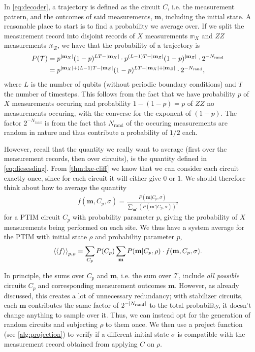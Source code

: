 In \cref{eq:decoder}, a trajectory is defined as the circuit $C$, i.e. the measurement pattern,
and the outcomes of said measurements, $\mathbf{m}$, including the initial
state. A reasonable place to start is to find a probability we average over.
If we split the measurement record into disjoint records of $X$
measurements $\mathbb{m}_X$ and $ZZ$ measurements $\mathbb{m}_Z$, we have that
the probability of a trajectory is
\begin{align}
      P(\mathcal{T}) &=
      p^{\abs{\mathbf{m}_X}}(1-p)^{LT-\abs{\mathbf{m}_X}}\cdot
      p^{(L-1)T-\abs{\mathbf{m}_Z}}(1-p)^{\abs{\mathbf{m}_Z}}\cdot
      2^{-N_\mathrm{rand}} \nonumber\\ &= 
      p^{\abs{\mathbf{m}_X}+(L-1)T-\abs{\mathbf{m}_Z}}(1-p)^{LT-\abs{\mathbf{m}_X}+\abs{\mathbf{m}_Z}}\cdot2^{-N_\mathrm{rand}}
,\end{align}
where $L$ is the number of qubits (without periodic boundary conditions) and
$T$ the number of timesteps. This follows from the fact that we have
probability $p$ of $X$ measurements occuring and probability $1-(1-p) = p$ of
$ZZ$ no measurements occuring, with the converse for the exponent of $(1-p)$.
The factor $2^{-N_\mathrm{rand}}$ is from the fact that $N_\mathrm{rand}$ of
the occuring measurements are random in nature and thus contribute a
probability of $1 /2$ each.

However, recall that the quantity we really want to average (first over the
measurement records, then over circuits), is the quantity defined in
\cref{eq:diesesding}. From \cref{thm:lxe-cliff} we know that we can consider
each circuit exactly once, since for each circuit it will either give $0$ or
$1$. We should therefore think about how to average the quantity
\begin{align}
      f(\mathbf{m}, C_p, \sigma) = \frac{P(\mathbf{m} |
     C_p,\sigma)}{\sum_{\mathbf{m'}}\left(P(\mathbf{m}'|C_p,\sigma)\right)^2}
\end{align}
for a PTIM circuit $C_p$ with probability parameter $p$, giving the probability
of $X$ measurements being performed on each site. We thus have a system average
for the PTIM with initial state $\rho$ and probability parameter $p$,
\begin{align}
      \expval{\expval{f}}_{p,\rho} = \sum_{C_p} P(C_p) \sum_\mathbf{m}
      P(\mathbf{m} |C_p,\rho)\cdot f(\mathbf{m},C_p, \sigma)
.\end{align}

In principle, the sums over $C_p$ and $\mathbf{m}$, i.e. the sum over
$\mathcal{T}$, include \emph{all possible} circuits $C_p$ and
corresponding measurement outcomes $\mathbf{m}$. However, as already discussed,
this creates a lot of unnecessary redundancy; with stabilizer circuits, each
$\mathbf{m}$ contributes 
the same factor of
$2^{-\abs{N_\mathrm{rand}}}$ to the total probability, it doesn't change
anything to sample over it. Thus, we can instead opt for the generation of
random circuits and subjecting $\rho$ to them once. We then use a project
function (see \cref{alg:projection}) to verify if a different initial state
$\sigma$ is compatible with the measurement record obtained from applying $C$
on $\rho$.

